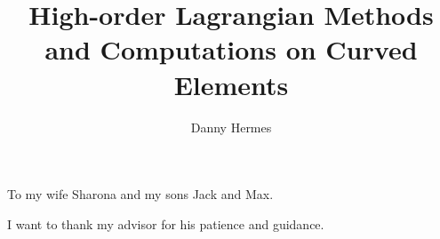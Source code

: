\documentclass{ucbthesis}
\theoremstyle{definition}
\begin{document}

\title{High-order Lagrangian Methods and Computations on Curved Elements}
\author{Danny Hermes}

\maketitle
\approvalpage
\copyrightpage



\begin{frontmatter}

\begin{dedication}
\null\vfil
\begin{center}
To my wife Sharona and my sons Jack and Max.
\end{center}
\vfil\null
\end{dedication}

\tableofcontents
\clearpage
\listoffigures
\clearpage
\listoftables

\begin{acknowledgements}
I want to thank my advisor for his patience and guidance.
\end{acknowledgements}

\end{frontmatter}

\pagestyle{headings}










\appendix



\end{document}
